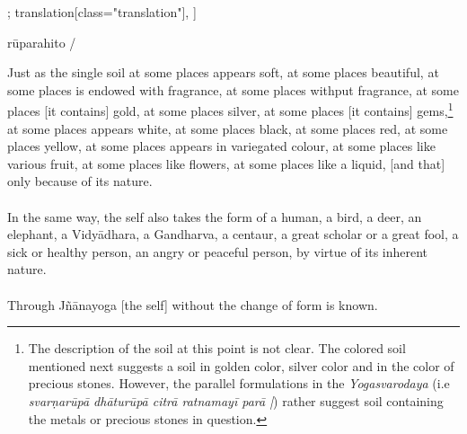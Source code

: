 \begin{alignment}[
  texts=edition[class="edition"];
  translation[class="translation"],
  ]
\begin{edition}
\begin{prose}[p22_02]
rūparahito
/
\end{prose}
  \end{edition}
  \begin{translation}
    \begin{tlate}[p22_02]
      \noindent
Just as the single soil at some places appears soft, at some places beautiful, at some places is endowed with fragrance, at some places withput fragrance, at some places [it contains] gold, at some places silver, at some places [it contains] gems,\footnote{The description of the soil at this point is not clear. The colored soil mentioned next suggests a soil in golden color, silver color and in the color of precious stones. However, the parallel formulations in the \textit{Yogasvarodaya} (i.e \textit{svarṇarūpā dhāturūpā citrā ratnamayī parā |}) rather suggest soil containing the metals or precious stones in question.} at some places appears white, at some places black, at some places red, at some places yellow, at some places appears in variegated colour, at some places like various fruit, 
at some places like flowers, at some places like a liquid, [and that] only because of its nature. \\\\
In the same way, the self also takes the form of a human, a bird, a deer, an elephant, a Vidyādhara, a Gandharva, a centaur, a great scholar or a great fool, 
a sick or healthy person, an angry or peaceful person, by virtue of its inherent nature. \\\\
Through Jñānayoga [the self] without the change of form is known.  
\flushpage
\end{tlate}
  \end{translation}
\end{alignment}
\pagebreak %
